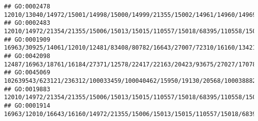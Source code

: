\documentclass[
]{article}
\begin{document}
\begin{verbatim}
## GO:0002478                                                                                                                                                                                                                                                                                                                         12010/13040/14972/15001/14998/15000/14999/21355/15002/14961/14960/14969/381091/16149
## GO:0002483                                                                                                                                                                                                                                                                                                       12010/14972/21354/21355/15006/15013/15015/110557/15018/68395/110558/15039/100529082/15024/667977/14990
## GO:0001909                                                                                                                                                                                                                               16963/30925/14061/12010/12481/83408/80782/16643/27007/72310/16160/13421/14972/21354/21355/15006/15013/15015/110557/15018/68395/110558/15039/100529082/15024/667977/14990/20400
## GO:0042098                                                                                                                                                                                                          12487/16963/18761/16184/27371/12578/22417/22163/20423/93675/27027/170786/24099/15930/12501/16160/20556/20304/12775/20533/72049/208154/320484/15000/14999/14960/547431/11629/12511/60533/58205/20371
## GO:0045069                                                                                                                                                                                                                                                          102639543/623121/236312/100033459/100040462/15950/19130/20568/100038882/23962/231655/246728/246727/23961/23960/246730/68713/69550/20304/58185/17858
## GO:0019883                                                                                                                                                                                                                                                                                                       12010/14972/21354/21355/15006/15013/15015/110557/15018/68395/110558/15039/100529082/15024/667977/14990
## GO:0001914                                                                                                                                                                                                                                                                                           16963/12010/16643/16160/14972/21355/15006/15013/15015/110557/15018/68395/110558/15039/100529082/15024/667977/14990

\end{verbatim}
\end{document}
